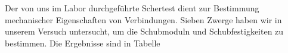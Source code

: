 Der von uns im Labor durchgeführte Schertest dient zur Bestimmung mechanischer Eigenschaften von Verbindungen.
Sieben Zwerge haben wir in unserem Versuch untersucht, um die Schubmoduln und Schubfestigkeiten zu bestimmen.
Die Ergebnisse sind in Tabelle %